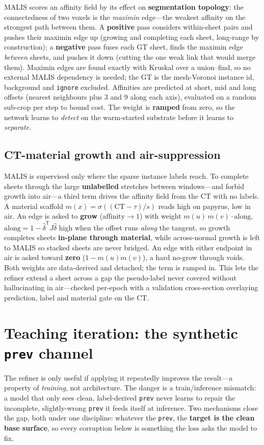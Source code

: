 \documentclass[10pt,twocolumn,a4paper]{article}
\newcommand{\code}[1]{\texttt{#1}}
\begin{document}
MALIS scores an affinity field by its effect on \textbf{segmentation topology}:
the connectedness of two voxels is the \emph{maximin} edge---the weakest affinity
on the strongest path between them. A \textbf{positive} pass considers within-sheet
pairs and pushes their maximin edge up (growing and completing each sheet,
long-range by construction); a \textbf{negative} pass fuses each GT sheet, finds
the maximin edge \emph{between} sheets, and pushes it down (cutting the one weak
link that would merge them). Maximin edges are found exactly with Kruskal over a
union--find, so no external MALIS dependency is needed; the GT is the mesh-Voronoi
instance id, background and \code{ignore} excluded. Affinities are predicted at
short, mid and long offsets (nearest neighbours plus 3 and 9 along each axis),
evaluated on a random sub-crop per step to bound cost. The weight is
\textbf{ramped} from zero, so the network learns to \emph{detect} on the
warm-started substrate before it learns to \emph{separate}.

\subsection{CT-material growth and air-suppression}
MALIS is supervised only where the sparse instance labels reach. To complete
sheets through the large \textbf{unlabelled} stretches between windows---and forbid
growth into air---a third term drives the affinity field from the CT with no
labels. A material scaffold $m(x)=\sigma((\mathrm{CT}-\tau)/s)$ reads high on
papyrus, low in air. An edge is asked to \textbf{grow} ($\mathrm{affinity}\to1$)
with weight $m(u)\,m(v)\cdot\mathrm{along}$,
$\mathrm{along}=1-\hat{\delta}^{\mathsf T}J\hat{\delta}$ high when the offset runs
\emph{along} the tangent, so growth completes sheets \textbf{in-plane through
material}, while across-normal growth is left to MALIS so stacked sheets are never
bridged. An edge with either endpoint in air is asked toward \textbf{zero}
($1-m(u)m(v)$), a hard no-grow through voids. Both weights are data-derived and
detached; the term is ramped in. This lets the refiner extend a sheet across a gap
the pseudo-label never covered without hallucinating in air---checked per-epoch
with a validation cross-section overlaying prediction, label and material gate on
the CT.

\section{Teaching iteration: the synthetic \code{prev} channel}\label{sec:teach}
The refiner is only useful if applying it repeatedly improves the result---a
property of \emph{training}, not architecture. The danger is a train/inference
mismatch: a model that only sees clean, label-derived \code{prev} never learns to
repair the incomplete, slightly-wrong \code{prev} it feeds itself at inference.
Two mechanisms close the gap, both under one discipline: whatever the \code{prev},
the \textbf{target is the clean base surface}, so every corruption below is
something the loss asks the model to fix.
\end{document}
